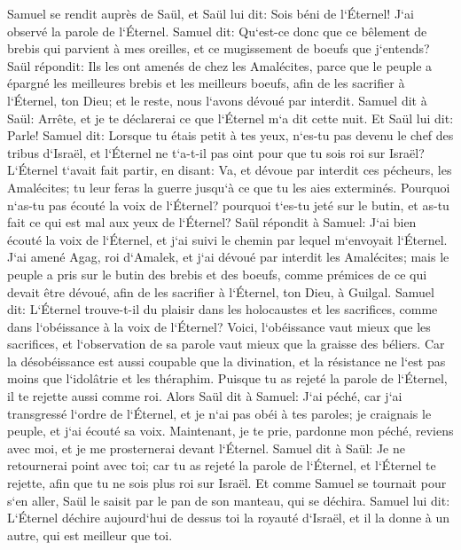 \verse Samuel se rendit auprès de Saül, et Saül lui dit: Sois béni de l`Éternel! J`ai observé la parole de l`Éternel. 
\verse Samuel dit: Qu`est-ce donc que ce bêlement de brebis qui parvient à mes oreilles, et ce mugissement de boeufs que j`entends? 
\verse Saül répondit: Ils les ont amenés de chez les Amalécites, parce que le peuple a épargné les meilleures brebis et les meilleurs boeufs, afin de les sacrifier à l`Éternel, ton Dieu; et le reste, nous l`avons dévoué par interdit. 
\verse Samuel dit à Saül: Arrête, et je te déclarerai ce que l`Éternel m`a dit cette nuit. Et Saül lui dit: Parle! 
\verse Samuel dit: Lorsque tu étais petit à tes yeux, n`es-tu pas devenu le chef des tribus d`Israël, et l`Éternel ne t`a-t-il pas oint pour que tu sois roi sur Israël? 
\verse L`Éternel t`avait fait partir, en disant: Va, et dévoue par interdit ces pécheurs, les Amalécites; tu leur feras la guerre jusqu`à ce que tu les aies exterminés. 
\verse Pourquoi n`as-tu pas écouté la voix de l`Éternel? pourquoi t`es-tu jeté sur le butin, et as-tu fait ce qui est mal aux yeux de l`Éternel? 
\verse Saül répondit à Samuel: J`ai bien écouté la voix de l`Éternel, et j`ai suivi le chemin par lequel m`envoyait l`Éternel. J`ai amené Agag, roi d`Amalek, et j`ai dévoué par interdit les Amalécites; 
\verse mais le peuple a pris sur le butin des brebis et des boeufs, comme prémices de ce qui devait être dévoué, afin de les sacrifier à l`Éternel, ton Dieu, à Guilgal. 
\verse Samuel dit: L`Éternel trouve-t-il du plaisir dans les holocaustes et les sacrifices, comme dans l`obéissance à la voix de l`Éternel? Voici, l`obéissance vaut mieux que les sacrifices, et l`observation de sa parole vaut mieux que la graisse des béliers. 
\verse Car la désobéissance est aussi coupable que la divination, et la résistance ne l`est pas moins que l`idolâtrie et les théraphim. Puisque tu as rejeté la parole de l`Éternel, il te rejette aussi comme roi. 
\verse Alors Saül dit à Samuel: J`ai péché, car j`ai transgressé l`ordre de l`Éternel, et je n`ai pas obéi à tes paroles; je craignais le peuple, et j`ai écouté sa voix. 
\verse Maintenant, je te prie, pardonne mon péché, reviens avec moi, et je me prosternerai devant l`Éternel. 
\verse Samuel dit à Saül: Je ne retournerai point avec toi; car tu as rejeté la parole de l`Éternel, et l`Éternel te rejette, afin que tu ne sois plus roi sur Israël. 
\verse Et comme Samuel se tournait pour s`en aller, Saül le saisit par le pan de son manteau, qui se déchira. 
\verse Samuel lui dit: L`Éternel déchire aujourd`hui de dessus toi la royauté d`Israël, et il la donne à un autre, qui est meilleur que toi. 
